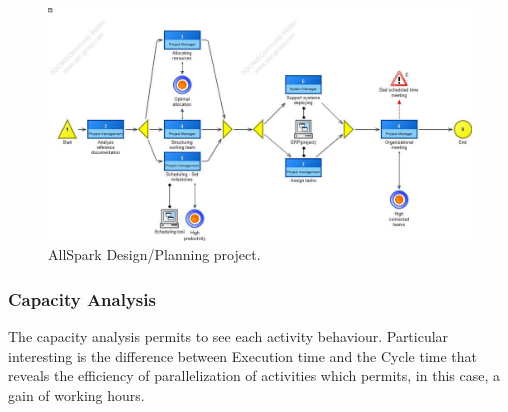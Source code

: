\begin{figure}[ht!]
\begin{centering}
\includegraphics[scale=0.50, angle=90]{assign2/adonis/imgs/design.jpg}
\caption{AllSpark Design/Planning project.}
\label{2img:desing}
\end{centering}
\end{figure}


\subsubsection{Capacity Analysis}
The capacity analysis permits to see each activity behaviour. Particular interesting is the difference between Execution time and the Cycle time that reveals the efficiency of parallelization of activities which permits, in this case, a gain of working hours.

